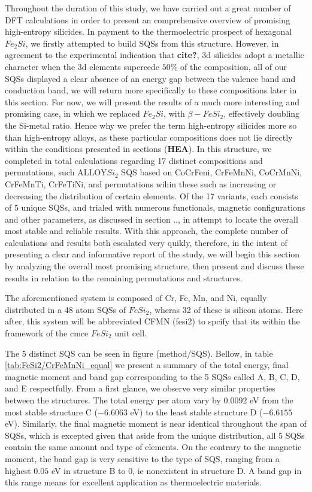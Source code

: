 Throughout the duration of this study, we have carried out a great number of DFT calculations in order to present an comprehensive overview of promising high-entropy silicides. In payment to the thermoelectric prospect of hexagonal $Fe_2Si$, we firstly attempted to build SQSs from this structure. However, in agreement to the experimental indication that \textbf{cite?}, 3d silicides adopt a metallic character when the 3d elements supercede $50\%$ of the composition, all of our SQSs displayed a clear absence of an energy gap between the valence band and conduction band, we will return  more specifically to these compositions later in this section. For now, we will present the results of a much more interesting and promising case, in which we replaced $Fe_2Si$, with $\beta-FeSi_2$, effectively doubling the Si-metal ratio. Hence why we prefer the term high-entropy silicides more so than high-entropy alloys, as these particular compositions does not lie directly within the conditions presented in sections (\textbf{HEA}). In this structure, we completed in total calculations regarding 17 distinct compositions and permutations, such $\text{ALLOY}Si_2$ SQS based on CoCrFeni, CrFeMnNi, CoCrMnNi, CrFeMnTi, CrFeTiNi, and permutations wihin these such as increasing or decreasing the distribution of certain elements. Of the 17 variants, each consists of 5 unique SQSs, and trialed with numerous functionals, magnetic configurations and other parameters, as discussed in section .., in attempt to locate the overall most stable and reliable results. With this approach, the complete number of calculations and results both escalated very quikly, therefore, in the intent of presenting a clear and informative report of the study, we will begin this section by analyzing the overall most promising structure, then present and discuss these results in relation to the remaining permutations and structures.    

The aforementioned system is composed of Cr, Fe, Mn, and Ni, equally distributed in a 48 atom SQSs of $FeSi_2$, wheras 32 of these is silicon atoms. Here after, this system will be abbreviated CFMN (fesi2) to spcify that its within the framework of the cmce $FeSi_2$ unit cell.
 
The 5 distinct SQS can be seen in figure (method/SQS). Bellow, in table \ref{tab:FeSi2/CrFeMnNi_equal} we present a summary of the total energy, final magnetic moment and band gap corresponding to the 5 SQSs called A, B, C, D, and E respectfully. From a first glance, we observe very similar properties between the structures. The total energy per atom vary by $0.0092$ eV from the most stable structure C ($-6.6063$ eV) to the least stable structure D ($-6.6155$ eV). Similarly, the final magnetic moment is near identical throughout the span of SQSs, which is excepted given that aside from the unique distribution, all 5 SQSs contain the same amount and type of elements. On the contrary to the magnetic moment, the band gap is very sensitive to the type of SQS, ranging from a highest $0.05$ eV in structure B to $0$, ie nonexistent in structure D. A band gap in this range means for excellent application as thermoelectric materials. 


